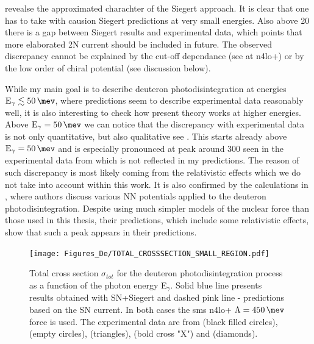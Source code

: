      revealse the approximated charachter of the Siegert approach.
    It is clear that one has to take with causion Siegert predictions at very small energies.
    Also above \SI{20}{\mev} there is a gap between Siegert results and experimental data,
    which points that more elaborated 2N current should be included in future.
    The observed discrepancy cannot be explained by the cut-off dependance
    (see  at \gls{n4lo+}) or by the low order of chiral potential (see discussion below).

    While my main goal is to describe deuteron photodisintegration
    at energies $\text{E}_\gamma \lesssim \SI{50}{\mev}$, 
    where predictions seem to describe experimental data reasonably well,
    it is also interesting to check how 
    present theory works at higher energies.
    Above $\text{E}_\gamma=\SI{50}{\mev}$
    we can notice that the discrepancy with experimental data is not only 
    quantitative, but also qualitative see .  
    This starts already above $\text{E}_\gamma=\SI{50}{\mev}$ and is especially pronounced at peak around \SI{300}{\mev}
    seen in the experimental data from \cite{Bernabei1986} which is not
    reflected in my predictions. The reason of such discrepancy 
    is most likely coming from the relativistic effects
    which we do not take into account within this work.
    It is also confirmed by the calculations in \cite{ArenhovelPhotodisint1991},
    where authors discuss various NN potentials applied to the deuteron photodisintegration.
    Despite using much simpler models of the nuclear force than those used in this thesis,
    their predictions, which include some relativistic effects, show that such a peak appears in their predictions. 
    
    
    
    \begin{figure}[h]
        \begin{center}
        \texttt{[image: Figures\_De/TOTAL\_CROSSSECTION\_SMALL\_REGION.pdf]}
        \end{center}
        \caption{Total cross section $\sigma_{tot}$ for the deuteron photodisintegration process
        as a function of the photon energy E$_\gamma$.
        Solid blue line presents results obtained with SN+Siegert 
        and dashed pink line - predictions based on the SN current.
        In both cases the \gls{sms} \gls{n4lo+} $\Lambda=\SI{450}{\mev}$ force is used.
        The experimental data are from \cite{Bernabei1986} (black filled circles),
        \cite{BOSMAN1979} (empty circles),
        \cite{Skopik1974} (triangles),
        \cite{Moreh1989} (bold cross "X") and
        \cite{Birenbaum1985} (diamonds).
        }
        \label{TOTAL_CROSS_small}
    \end{figure}

